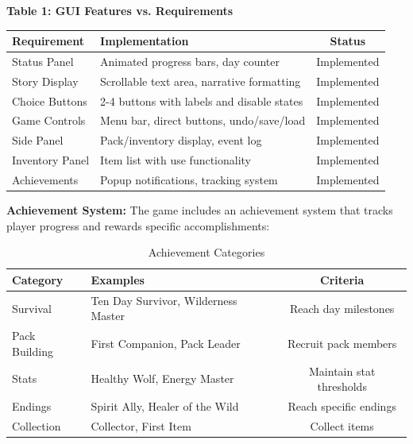 \documentclass[12pt,a4paper]{article}
\begin{document}
\textbf{Table 1: GUI Features vs. Requirements}
\begin{center}
	\begin{tabular}{@{}llc@{}}
		\toprule
		\textbf{Requirement} & \textbf{Implementation}                    & \textbf{Status} \\ \midrule
		Status Panel         & Animated progress bars, day counter        & Implemented     \\
		Story Display        & Scrollable text area, narrative formatting & Implemented     \\
		Choice Buttons       & 2-4 buttons with labels and disable states & Implemented     \\
		Game Controls        & Menu bar, direct buttons, undo/save/load   & Implemented     \\
		Side Panel           & Pack/inventory display, event log          & Implemented     \\
		Inventory Panel      & Item list with use functionality           & Implemented     \\
		Achievements         & Popup notifications, tracking system       & Implemented     \\
		\bottomrule
	\end{tabular}
\end{center}

\vspace{0.3cm}

\textbf{Achievement System:} The game includes an achievement system that tracks player progress and rewards specific accomplishments:

\begin{table}[h]
	\centering
	\caption{Achievement Categories}
	\begin{tabular}{@{}lp{8cm}c@{}}
		\toprule
		\textbf{Category} & \textbf{Examples}                                    & \textbf{Criteria} \\ \midrule
		Survival         & Ten Day Survivor, Wilderness Master                  & Reach day milestones \\
		Pack Building    & First Companion, Pack Leader                         & Recruit pack members \\
		Stats            & Healthy Wolf, Energy Master                          & Maintain stat thresholds \\
		Endings          & Spirit Ally, Healer of the Wild                      & Reach specific endings \\
		Collection       & Collector, First Item                                & Collect items \\
		\bottomrule
	\end{tabular}
\end{table}
\end{document}
